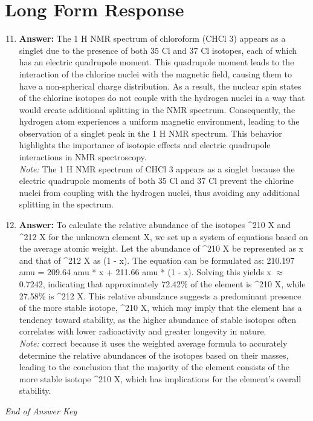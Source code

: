 \documentclass[12pt]{article}
\begin{document}
\section*{Long Form Response}
\begin{enumerate}[label=\arabic*.]
\setcounter{enumi}{10}
\item \textbf{Answer:} The 1 H NMR spectrum of chloroform (CHCl 3) appears as a singlet due to the presence of both 35 Cl and 37 Cl isotopes, each of which has an electric quadrupole moment. This quadrupole moment leads to the interaction of the chlorine nuclei with the magnetic field, causing them to have a non-spherical charge distribution. As a result, the nuclear spin states of the chlorine isotopes do not couple with the hydrogen nuclei in a way that would create additional splitting in the NMR spectrum. Consequently, the hydrogen atom experiences a uniform magnetic environment, leading to the observation of a singlet peak in the 1 H NMR spectrum. This behavior highlights the importance of isotopic effects and electric quadrupole interactions in NMR spectroscopy.
\\ \textit{Note:} The 1 H NMR spectrum of CHCl 3 appears as a singlet because the electric quadrupole moments of both 35 Cl and 37 Cl prevent the chlorine nuclei from coupling with the hydrogen nuclei, thus avoiding any additional splitting in the spectrum.
\item \textbf{Answer:} To calculate the relative abundance of the isotopes ^210 X and ^212 X for the unknown element X, we set up a system of equations based on the average atomic weight. Let the abundance of ^210 X be represented as x and that of ^212 X as (1 - x). The equation can be formulated as: 210.197 amu = 209.64 amu * x + 211.66 amu * (1 - x). Solving this yields x \ensuremath{\approx} 0.7242, indicating that approximately 72.42\% of the element is ^210 X, while 27.58\% is ^212 X. This relative abundance suggests a predominant presence of the more stable isotope, ^210 X, which may imply that the element has a tendency toward stability, as the higher abundance of stable isotopes often correlates with lower radioactivity and greater longevity in nature.
\\ \textit{Note:} correct because it uses the weighted average formula to accurately determine the relative abundances of the isotopes based on their masses, leading to the conclusion that the majority of the element consists of the more stable isotope ^210 X, which has implications for the element's overall stability.
\end{enumerate}

\vfill
\noindent\textit{End of Answer Key}
\end{document}
